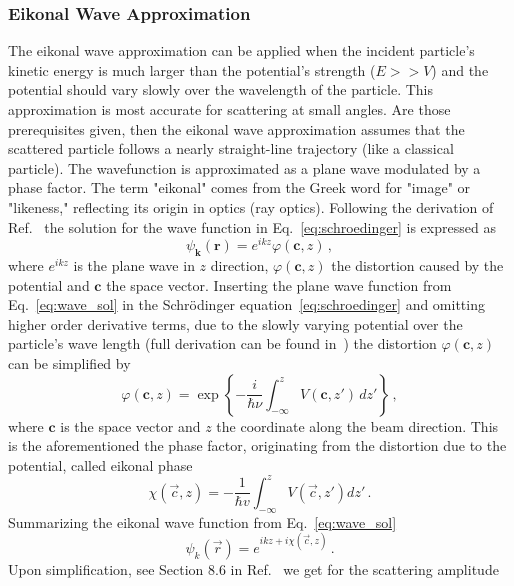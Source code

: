 \subsubsection{Eikonal Wave Approximation}
The eikonal wave approximation can be applied when the incident particle's kinetic energy is much larger than the potential's strength ($ E >> V$) and the potential should vary slowly over the wavelength of the particle. This approximation is most accurate for scattering at small angles. Are those prerequisites given, then the eikonal wave approximation assumes that the scattered particle follows a nearly straight-line trajectory (like a classical particle). The wavefunction is approximated as a plane wave modulated by a phase factor. The term "eikonal" comes from the Greek word for "image" or "likeness," reflecting its origin in optics (ray optics).
Following the derivation of Ref.~\cite{bertulani2019introduction} the solution for the wave function in Eq.~\ref{eq:schroedinger} is expressed as
\begin{equation}\label{eq:wave_sol}
\psi_{\mathbf{k}}(\mathbf{r}) = e^{ikz} \varphi(\mathbf{c}, z) \, ,
\end{equation}
where $e^{ikz}$ is the plane wave in $z$ direction, $\varphi(\mathbf{c}, z)$ the distortion caused by the potential and $\mathbf{c}$ the space vector.
Inserting the plane wave function from Eq.~\ref{eq:wave_sol} in the Schr\"odinger equation~\ref{eq:schroedinger} and omitting higher order derivative terms, due to the slowly varying potential over the particle's wave length (full derivation can be found in~\cite{bertulani2019introduction}) the distortion $\varphi(\mathbf{c}, z)$ can be simplified by
\begin{equation}
\varphi(\mathbf{c}, z) = \exp \left\{ -\frac{i}{\hbar \nu} \int_{-\infty}^{z} V(\mathbf{c}, z') \, dz' \right\} \, ,
\end{equation}
where $\mathbf{c}$ is the space vector and $z$ the coordinate along the beam direction.  
This is the aforementioned the phase factor, originating from the distortion due to the potential, called eikonal phase
\begin{equation}\label{eq:eikonal_phase}
\chi(\vec{c}, z) = - \frac{1}{\hbar v} \int_{-\infty}^{z} V(\vec{c}, z') dz' \, .
\end{equation}
Summarizing the eikonal wave function from Eq.~\ref{eq:wave_sol}
\begin{equation}
\psi_k(\vec{r}) = e^{ikz+i\chi(\vec{c},z)} \, .
\end{equation}
Upon simplification, see Section 8.6 in Ref.~\cite{bertulani2019introduction} we get for the scattering amplitude
